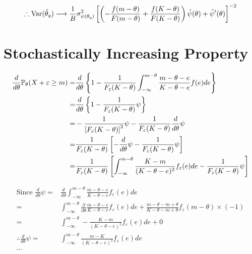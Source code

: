 \begin{equation}
    \therefore \mathrm{Var}(\hat\theta_q) \longrightarrow \frac{1}{B} \sigma^2_{\psi(\theta_q)} \left[ \left( - \frac{f(m - \theta)}{F(m - \theta)} + \frac{f(K - \theta)}{F(K - \theta)} \right) \hat\psi(\theta) + \hat\psi^\prime(\theta) \right]^{-2}
\end{equation}

\clearpage

\section{Stochastically Increasing Property}

\begingroup
\allowdisplaybreaks    
\begin{align}
    \frac{d}{d\theta} \mathbb{P}_\theta (X+\varepsilon \geq m)
        =& \frac{d}{d\theta} \left\{ 1 - \frac{1}{F_\varepsilon (K-\theta) } \int_{-\infty}^{m-\theta} \frac{m - \theta - e }{K - \theta - e} f(e) de \right\} \\
        =& \frac{d}{d\theta} \left\{ 1 - \frac{1}{F_\varepsilon (K-\theta) } \psi \right\} \\
        =& - \frac{1}{\left[ F_\varepsilon (K-\theta) \right]^2 } \psi - \frac{1}{ F_\varepsilon (K-\theta) } \frac{d}{d\theta} \psi \\
        =& \frac{1}{F_\varepsilon (K-\theta)} \left[ -\frac{d}{d\theta} \psi - \frac{1}{ F_\varepsilon (K-\theta) } \psi \right] \\
        =& \frac{1}{ F_\varepsilon (K-\theta) } \left[  \int_{-\infty}^{m-\theta} \frac{K - m }{(K - \theta - e)^2} f_\varepsilon(e) de - \frac{1}{ F_\varepsilon (K-\theta) } \psi \right]
\end{align}

\begin{align}
    \text{Since } \frac{d}{d\theta} \psi
        =& \frac{d}{d\theta} \int_{-\infty}^{m-\theta} \frac{m - \theta - e }{K - \theta - e} f_\varepsilon(e) de \\
        =& \int_{-\infty}^{m-\theta} \frac{\partial}{\partial \theta} \frac{m - \theta - e }{K - \theta - e} f_\varepsilon(e) de + \frac{m - \theta - m + \theta }{K - \theta - m + \theta} f_\varepsilon(m-\theta) \times (-1) \\
        =& \int_{-\infty}^{m-\theta} - \frac{K - m }{(K - \theta - e)^2} f_\varepsilon(e) de + 0 \\
    \therefore \frac{d}{d\theta} \psi =& \int_{-\infty}^{m-\theta} \frac{m - K }{(K - \theta - e)^2} f_\varepsilon(e) de \\
    \cdots
\end{align}

\endgroup
